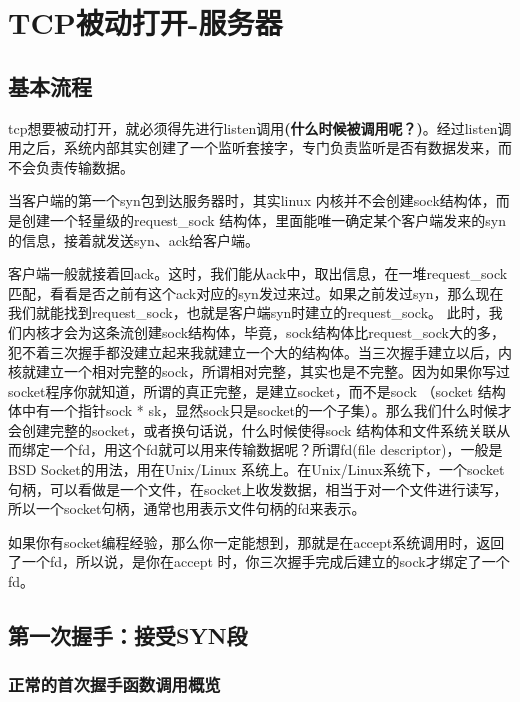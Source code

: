 \documentclass[11pt, a4paper,oneside]{book}
\theoremstyle{ocrenumbox}
\theoremstyle{purplenumbox}
\theoremstyle{blackbox}
\begin{document}
    \section{TCP被动打开-服务器}
        \subsection{基本流程}
            tcp想要被动打开，就必须得先进行listen调用\textbf{(什么时候被调用呢？)}。经过listen调用之后，系统内部其实创建了一个监听套接字，专门负责监听是否有数据发来，而不会负责传输数据。

            当客户端的第一个syn包到达服务器时，其实linux 内核并不会创建sock结构体，而是创建一个轻量级的request\_sock 结构体，里面能唯一确定某个客户端发来的syn的信息，接着就发送syn、ack给客户端。

            客户端一般就接着回ack。这时，我们能从ack中，取出信息，在一堆request\_sock匹配，看看是否之前有这个ack对应的syn发过来过。如果之前发过syn，那么现在我们就能找到request\_sock，也就是客户端syn时建立的request\_sock。 此时，我们内核才会为这条流创建sock结构体，毕竟，sock结构体比request\_sock大的多，犯不着三次握手都没建立起来我就建立一个大的结构体。当三次握手建立以后，内核就建立一个相对完整的sock，所谓相对完整，其实也是不完整。因为如果你写过socket程序你就知道，所谓的真正完整，是建立socket，而不是sock （socket 结构体中有一个指针sock * sk，显然sock只是socket的一个子集）。那么我们什么时候才会创建完整的socket，或者换句话说，什么时候使得sock 结构体和文件系统关联从而绑定一个fd，用这个fd就可以用来传输数据呢？所谓fd(file descriptor)，一般是BSD Socket的用法，用在Unix/Linux 系统上。在Unix/Linux系统下，一个socket句柄，可以看做是一个文件，在socket上收发数据，相当于对一个文件进行读写，所以一个socket句柄，通常也用表示文件句柄的fd来表示。

            如果你有socket编程经验，那么你一定能想到，那就是在accept系统调用时，返回了一个fd，所以说，是你在accept 时，你三次握手完成后建立的sock才绑定了一个 fd。
        \subsection{第一次握手：接受SYN段}
            \subsubsection{正常的首次握手函数调用概览}
				\begin{figure}[htb]        
				\end{figure}       
\end{document}
